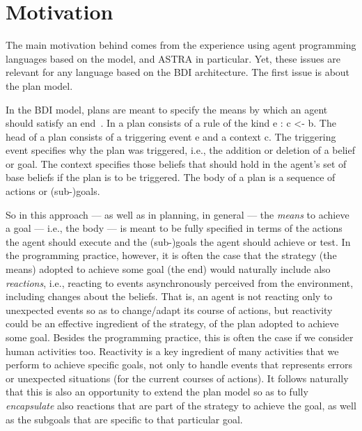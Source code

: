 \section{Motivation}
\label{sec:motivation}

The main motivation behind {\aser} comes from the experience using
agent programming languages based on the {\asl} model, {\jason} and
ASTRA in particular.
%
Yet, these issues are relevant for any language based on the BDI
architecture.
%
The first issue is about the plan model.

%
In the BDI model, plans are meant to specify the means by which an
agent should satisfy an end~\cite{Rao96}.
%
In {\asl} a plan consists of a rule of the kind \textsf{e : c <- b}.
%
The head of a plan consists of a triggering event \textsf{e} and a
context \textsf{c}.
%
The triggering event specifies why the plan was triggered, i.e., the
addition or deletion of a belief or goal.
%
The context specifies those beliefs that should hold in the agent's
set of base beliefs if the plan is to be triggered.
%
The body of a plan is a sequence of actions or (sub-)goals.
%

%
%
So in this approach --- as well as in planning, in general --- the
\emph{means} to achieve a goal --- i.e., the body --- is meant to be
fully specified in terms of the actions the agent should execute and
the (sub-)goals the agent should achieve or test.
%
In the programming practice, however, it is often the case that the
strategy (the means) adopted to achieve some goal (the end) would
naturally include also \emph{reactions}, i.e., reacting to events
asynchronously perceived from the environment, including changes about
the beliefs.
% 
That is, an agent is not reacting only to unexpected events so as to
change/adapt its course of actions, but reactivity could be an
effective ingredient of the strategy, of the plan adopted to achieve
some goal.
%
Besides the programming practice, this is often the case if we
consider human activities too. Reactivity is a key ingredient of many
activities that we perform to achieve specific goals, not only to
handle events that represents errors or unexpected situations (for the
current courses of actions).
%
It follows naturally that this is also an opportunity to extend the
plan model so as to fully \emph{encapsulate} also reactions that are
part of the strategy to achieve the goal, as well as the subgoals that
are specific to that particular goal.


